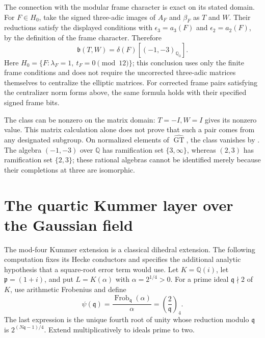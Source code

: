 The connection with the modular frame character is exact on its stated
domain. For $F\in H_0$, take the signed three-adic images of $A_F$ and
$\beta_F$ as $T$ and $W$. Their reductions satisfy the displayed conditions
with $\epsilon_3=a_3(F)$ and $\epsilon_2=a_2(F)$, by the definition of the
frame character. Therefore
\[
 \mathfrak b(T,W)=\delta(F)[(-1,-3)_{\mathbb Q_3}].
\]
Here $H_0=\{F:\lambda_F=1,\ t_F=0\pmod{12}\}$; this conclusion uses only
the finite frame conditions and does not require the uncorrected
three-adic matrices themselves to centralize the elliptic matrices.
For corrected frame pairs satisfying the centralizer norm forms above,
the same formula holds with their specified signed frame bits.

The class can be nonzero on the matrix domain: $T=-I,W=I$ gives its
nonzero value. This matrix calculation alone does not prove that such a
pair comes from any designated subgroup. On normalized elements of
$\widehat{\operatorname{GT}}$, the class vanishes by \cite[Theorem~3]{H17}. The algebra $(-1,-3)$ over $\mathbb Q$
has ramification set $\{3,\infty\}$, whereas $(2,3)$ has ramification set
$\{2,3\}$; these rational algebras cannot be identified merely because
their completions at three are isomorphic.

\section{The quartic Kummer layer over the Gaussian field}
The mod-four Kummer extension is a classical dihedral extension.
The following computation fixes its Hecke conductors and specifies the
additional analytic hypothesis that a square-root error term would use.
Let $K=\mathbb Q(i)$, let $\mathfrak p=(1+i)$, and put
$L=K(\alpha)$ with $\alpha=2^{1/4}>0$.
For a prime ideal $\mathfrak q\nmid2$ of $K$, use arithmetic Frobenius and define
\[
 \psi(\mathfrak q)=\frac{\operatorname{Frob}_{\mathfrak q}(\alpha)}{\alpha}
  =\left(\frac{2}{\mathfrak q}\right)_4.
\]
The last expression is the unique fourth root of unity whose reduction modulo
$\mathfrak q$ is $2^{(N\mathfrak q-1)/4}$. Extend multiplicatively to ideals
prime to two.

